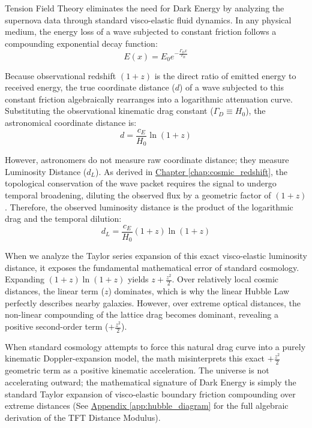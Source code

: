 Tension Field Theory eliminates the need for Dark Energy by analyzing the supernova data through standard visco-elastic fluid dynamics. In any physical medium, the energy loss of a wave subjected to constant friction follows a compounding exponential decay function:
\begin{equation}
    E(x) = E_0 e^{-\frac{\Gamma_D x}{c_E}}
\end{equation}

Because observational redshift $(1+z)$ is the direct ratio of emitted energy to received energy, the true coordinate distance ($d$) of a wave subjected to this constant friction algebraically rearranges into a logarithmic attenuation curve. Substituting the observational kinematic drag constant ($\Gamma_D \equiv H_0$), the astronomical coordinate distance is:
\begin{equation}
    d = \frac{c_E}{H_0} \ln(1+z)
\end{equation}

However, astronomers do not measure raw coordinate distance; they measure Luminosity Distance ($d_L$). As derived in \hyperref[chap:cosmic_redshift]{Chapter \ref*{chap:cosmic_redshift}}, the topological conservation of the wave packet requires the signal to undergo temporal broadening, diluting the observed flux by a geometric factor of $(1+z)$. Therefore, the observed luminosity distance is the product of the logarithmic drag and the temporal dilution:
\begin{equation}
    d_L = \frac{c_E}{H_0} (1+z)\ln(1+z)
\end{equation}

When we analyze the Taylor series expansion of this exact visco-elastic luminosity distance, it exposes the fundamental mathematical error of standard cosmology. Expanding $(1+z)\ln(1+z)$ yields $z + \frac{z^2}{2}$. Over relatively local cosmic distances, the linear term ($z$) dominates, which is why the linear Hubble Law perfectly describes nearby galaxies. However, over extreme optical distances, the non-linear compounding of the lattice drag becomes dominant, revealing a positive second-order term ($+\frac{z^2}{2}$).

When standard cosmology attempts to force this natural drag curve into a purely kinematic Doppler-expansion model, the math misinterprets this exact $+\frac{z^2}{2}$ geometric term as a positive kinematic acceleration. The universe is not accelerating outward; the mathematical signature of Dark Energy is simply the standard Taylor expansion of visco-elastic boundary friction compounding over extreme distances (See \hyperref[app:hubble_diagram]{Appendix \ref*{app:hubble_diagram}} for the full algebraic derivation of the TFT Distance Modulus).

